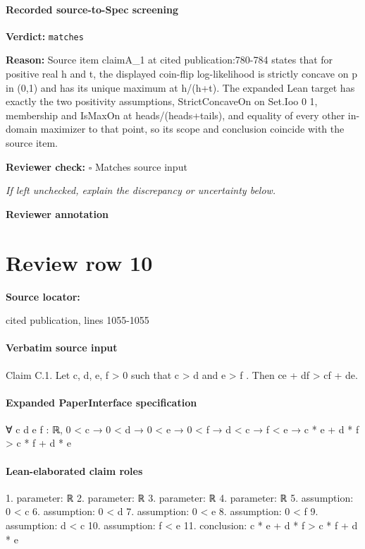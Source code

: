 \documentclass[10pt]{article}
\newcommand{\reviewerbox}{%
  \par\noindent\fbox{\parbox{0.96\linewidth}{\rule{0pt}{0.38in}}}\par
}
\newcommand{\reviewmatch}[1]{%
  \par\noindent\textbf{Reviewer check:} $\square$\; #1\par
  \noindent\emph{If left unchecked, explain the discrepancy or uncertainty below.}\par
}
\begin{document}
\paragraph{Recorded source-to-Spec screening}
\textbf{Verdict:} \texttt{matches}
\\
{\raggedright
\textbf{Reason:} Source item claimA\_\allowbreak{}1 at cited publication:\allowbreak{}780-\allowbreak{}784 states that for positive real h and t, the displayed coin-\allowbreak{}flip log-\allowbreak{}likelihood is strictly concave on p in (0,1) and has its unique maximum at h/\allowbreak{}(h+t).\allowbreak{} The expanded Lean target has exactly the two positivity assumptions, StrictConcaveOn on Set.\allowbreak{}Ioo 0 1, membership and IsMaxOn at heads/\allowbreak{}(heads+tails), and equality of every other in-\allowbreak{}domain maximizer to that point, so its scope and conclusion coincide with the source item.\allowbreak{}
\par}
\reviewmatch{Matches source input}
\noindent\textbf{Reviewer annotation}\par
\reviewerbox
\clearpage
\hypertarget{source-claim-dacf685bcf1289ee}{}
\section*{Review row 10}
\textbf{Source locator:} {\footnotesize\raggedright cited publication, lines 1055-\allowbreak{}1055\par}
\paragraph{Verbatim source input}
\begin{ReviewVerbatim}
Claim C.1. Let c, d, e, f > 0 such that c > d and e > f . Then ce + df > cf + de.
\end{ReviewVerbatim}



\paragraph{Expanded PaperInterface specification}
\begin{ReviewVerbatim}
∀ {c d e f : ℝ}, 0 < c → 0 < d → 0 < e → 0 < f → d < c → f < e → c * e + d * f > c * f + d * e
\end{ReviewVerbatim}


\paragraph{Lean-elaborated claim roles}\begin{ReviewVerbatim}
1. parameter: ℝ
2. parameter: ℝ
3. parameter: ℝ
4. parameter: ℝ
5. assumption: 0 < c
6. assumption: 0 < d
7. assumption: 0 < e
8. assumption: 0 < f
9. assumption: d < c
10. assumption: f < e
11. conclusion: c * e + d * f > c * f + d * e
\end{ReviewVerbatim}
\end{document}

